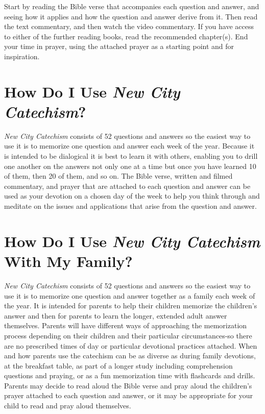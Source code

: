 \documentclass[00-main.tex]{subfiles}
\begin{document}
Start by reading the Bible verse that accompanies each question and answer, and seeing how it applies and how the question and answer derive from it. Then read the text commentary, and then watch the video commentary. If you have access to either of the further reading books, read the recommended chapter(s). End your time in prayer, using the attached prayer as a starting point and for inspiration.

\section[How Do I Use {\em New City Catechism}?][Using the {\em Catechism}]{How Do I Use {\em New City Catechism}?}

\emph{New City Catechism}\/ consists of 52 questions and answers so the easiest way to use it is to memorize one question and answer each week of the year. Because it is intended to be dialogical it is best to learn it with others, enabling you to drill one another on the answers not only one at a time but once you have learned 10 of them, then 20 of them, and so on. The Bible verse, written and filmed commentary, and prayer that are attached to each question and answer can be used as your devotion on a chosen day of the week to help you think through and meditate on the issues and applications that arise from the question and answer.

\section[How Do I Use {\em New City Catechism}\/ With My Family?][{\em New City Catechism}\/ With A Family]{How Do I Use {\em New City Catechism}\/ With My Family?}

\emph{New City Catechism}\/ consists of 52 questions and answers so the easiest way to use it is to memorize one question and answer together as a family each week of the year. It is intended for parents to help their children memorize the children's answer and then for parents to learn the longer, extended adult answer themselves. Parents will have different ways of approaching the memorization process depending on their children and their particular circumstances-so there are no prescribed times of day or particular devotional practices attached. When and how parents use the catechism can be as diverse as during family devotions, at the breakfast table, as part of a longer study including comprehension questions and praying, or as a fun memorization time with flashcards and drills. Parents may decide to read aloud the Bible verse and pray aloud the children's prayer attached to each question and answer, or it may be appropriate for your child to read and pray aloud themselves.
\end{document}

